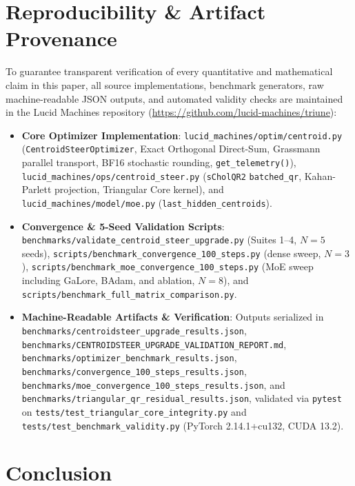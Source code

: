 \documentclass[10pt,twocolumn,letterpaper]{article}
\begin{document}
\section{Reproducibility \& Artifact Provenance}

To guarantee transparent verification of every quantitative and mathematical claim in this paper, all source implementations, benchmark generators, raw machine-readable JSON outputs, and automated validity checks are maintained in the Lucid Machines repository (\url{https://github.com/lucid-machines/triune}):
\begin{itemize}\raggedright\setlength{\itemsep}{2pt}
    \item \textbf{Core Optimizer Implementation}: \nolinkurl{lucid_machines/optim/centroid.py} (\texttt{CentroidSteerOptimizer}, Exact Orthogonal Direct-Sum, Grassmann parallel transport, BF16 stochastic rounding, \texttt{get\_telemetry()}), \nolinkurl{lucid_machines/ops/centroid_steer.py} (\texttt{sCholQR2} \texttt{batched\_qr}, Kahan-Parlett projection, Triangular Core kernel), and \nolinkurl{lucid_machines/model/moe.py} (\texttt{last\_hidden\_centroids}).
    \item \textbf{Convergence \& 5-Seed Validation Scripts}: \nolinkurl{benchmarks/validate_centroid_steer_upgrade.py} (Suites 1--4, $N=5$ seeds), \nolinkurl{scripts/benchmark_convergence_100_steps.py} (dense sweep, $N=3$), \nolinkurl{scripts/benchmark_moe_convergence_100_steps.py} (MoE sweep including GaLore, BAdam, and ablation, $N=8$), and \nolinkurl{scripts/benchmark_full_matrix_comparison.py}.
    \item \textbf{Machine-Readable Artifacts \& Verification}: Outputs serialized in \nolinkurl{benchmarks/centroidsteer_upgrade_results.json}, \nolinkurl{benchmarks/CENTROIDSTEER_UPGRADE_VALIDATION_REPORT.md}, \nolinkurl{benchmarks/optimizer_benchmark_results.json}, \nolinkurl{benchmarks/convergence_100_steps_results.json}, \nolinkurl{benchmarks/moe_convergence_100_steps_results.json}, and \nolinkurl{benchmarks/triangular_qr_residual_results.json}, validated via \texttt{pytest} on \nolinkurl{tests/test_triangular_core_integrity.py} and \nolinkurl{tests/test_benchmark_validity.py} (PyTorch 2.14.1+cu132, CUDA 13.2).
\end{itemize}

\section{Conclusion}
\end{document}

